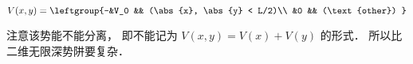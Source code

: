 
\begin{issues}
\issueDraft
\end{issues}

\begin{equation}
V(x,y) = \leftgroup{-&V_0 && (\abs{x}, \abs{y} < L/2)\\
&0 && (\text{other}) }
\end{equation}

注意该势能不能分离， 即不能记为 $V(x,y) = V(x) + V(y)$ 的形式． 所以比二维无限深势阱要复杂．
